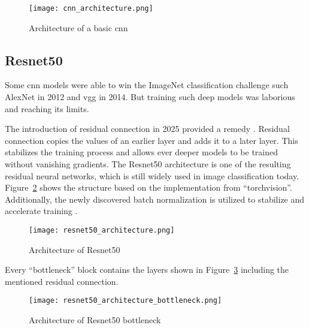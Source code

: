 \begin{figure}[H]
    \begin{center}
    \texttt{[image: cnn\_architecture.png]}
    \caption{Architecture of a basic \gls{cnn}}\label{fig:cnn_architecture}
    \end{center}
\end{figure}

\subsection{Resnet50}
Some \gls{cnn} models were able to win the ImageNet classification challenge such AlexNet \autocite{krizhevsky2012} in 2012 and \gls{vgg} \autocite{simonyan2015} in 2014. But training such deep models was laborious and reaching its limits. 

The introduction of residual connection in 2025 provided a remedy \autocite{he2015}. Residual connection copies the values of an earlier layer and adds it to a later layer. This stabilizes the training process and allows ever deeper models to be trained without vanishing gradients.
The Resnet50 architecture is one of the resulting residual neural networks, which is still widely used in image classification today. Figure~\ref{fig:resnet50_architecture} shows the structure based on the implementation from ``torchvision''. Additionally, the newly discovered batch normalization is utilized to stabilize and accelerate training \autocite{ioffe2015}.

\begin{figure}[H]
    \begin{center}
    \texttt{[image: resnet50\_architecture.png]}
    \caption{Architecture of Resnet50}\label{fig:resnet50_architecture}
    \end{center}
\end{figure}

Every ``bottleneck'' block contains the layers shown in Figure~\ref{fig:resnet50_architecture_bottleneck} including the mentioned residual connection.

\begin{figure}[H]
    \begin{center}
    \texttt{[image: resnet50\_architecture\_bottleneck.png]}
    \caption{Architecture of Resnet50 bottleneck}\label{fig:resnet50_architecture_bottleneck}
    \end{center}
\end{figure}

\newpage

